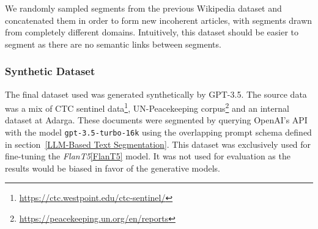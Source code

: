 We randomly sampled segments from the previous Wikipedia dataset and concatenated them in order to form new incoherent articles, with segments drawn from completely different domains. Intuitively, this dataset should be easier to segment as there are no semantic links between segments.

\subsubsection{Synthetic Dataset}

The final dataset used was generated synthetically by GPT-3.5. The source data was a mix of CTC sentinel data\footnote{\url{https://ctc.westpoint.edu/ctc-sentinel/}}, UN-Peacekeeping corpus\footnote{\url{https://peacekeeping.un.org/en/reports}} and an internal dataset at Adarga. These documents were segmented by querying OpenAI's API with the model \texttt{gpt-3.5-turbo-16k} using the overlapping prompt schema defined in section~\ref{LLM-Based Text Segmentation}. This dataset was exclusively used for fine-tuning the \emph{FlanT5}\ref{FlanT5} model. It was not used for evaluation as the results would be biased in favor of the generative models.